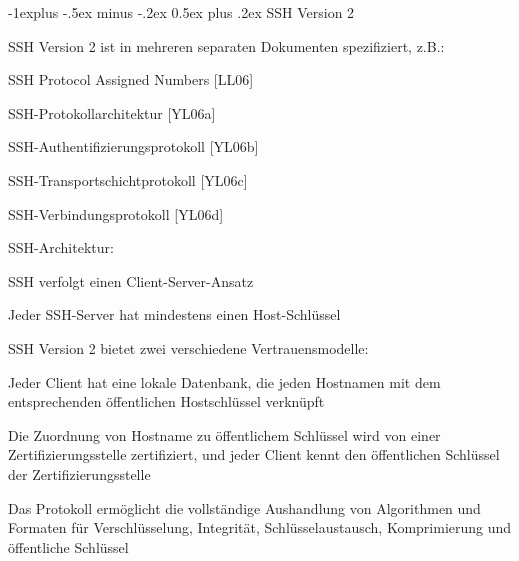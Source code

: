 \documentclass[a4paper]{article}
\makeatletter
\renewcommand{\subsection}{\@startsection{subsection}{2}{0mm}%
 {-1explus -.5ex minus -.2ex}%
 {0.5ex plus .2ex}%
 {\normalfont\normalsize\bfseries}}
\makeatother
\begin{document}
\begin{multicols}{3}
\begin{itemize*}
            \subsection{SSH Version 2}
            \begin{itemize*}
                  \item       SSH Version 2 ist in mehreren separaten Dokumenten spezifiziert, z.B.:
                  \begin{itemize*}
                        \item SSH Protocol Assigned Numbers {[}LL06{]}
                        \item SSH-Protokollarchitektur {[}YL06a{]}
                        \item SSH-Authentifizierungsprotokoll {[}YL06b{]}
                        \item SSH-Transportschichtprotokoll {[}YL06c{]}
                        \item SSH-Verbindungsprotokoll {[}YL06d{]}
                  \end{itemize*}
                  \item       SSH-Architektur:
                  \begin{itemize*}
                        \item SSH verfolgt einen Client-Server-Ansatz
                        \item Jeder SSH-Server hat mindestens einen Host-Schlüssel
                        \item SSH Version 2 bietet zwei verschiedene Vertrauensmodelle:
                        \begin{itemize*} \item Jeder Client hat eine lokale Datenbank, die jeden Hostnamen mit dem entsprechenden öffentlichen Hostschlüssel verknüpft \item Die Zuordnung von Hostname zu öffentlichem Schlüssel wird von einer Zertifizierungsstelle zertifiziert, und jeder Client kennt den öffentlichen Schlüssel der Zertifizierungsstelle \end{itemize*}
                        \item Das Protokoll ermöglicht die vollständige Aushandlung von Algorithmen und Formaten für Verschlüsselung, Integrität, Schlüsselaustausch, Komprimierung und öffentliche Schlüssel
                  \end{itemize*}
            \end{itemize*}


\end{itemize*}
\end{multicols}
\end{document}
